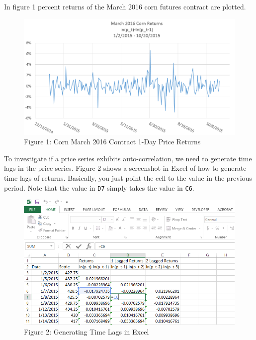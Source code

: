 \documentclass[
  letterpaper,
  DIV=11,
  numbers=noendperiod]{scrreprt}
\begin{document}
In figure 1 percent returns of the March 2016 corn futures contract are
plotted.

\begin{figure}

{\centering \includegraphics{images/12_corn_h2016.png}

}

\caption{Figure 1: Corn March 2016 Contract 1-Day Price Returns}

\end{figure}

To investigate if a price series exhibits auto-correlation, we need to
generate time lags in the price series. Figure 2 shows a screenshot in
Excel of how to generate time lags of returns. Basically, you just point
the cell to the value in the previous period. Note that the value in
\texttt{D7} simply takes the value in \texttt{C6}.

\begin{figure}

{\centering \includegraphics{images/12.lags.png}

}

\caption{Figure 2: Generating Time Lags in Excel}

\end{figure}
\end{document}
